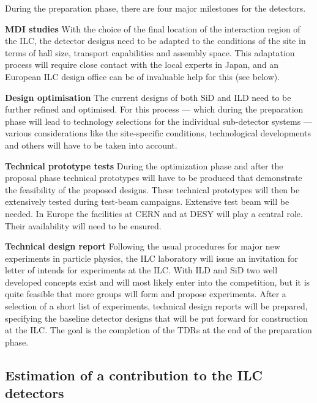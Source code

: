 \documentclass[%
 reprint,
 amsmath,amssymb,
 aps,
]{revtex4-1}
\begin{document}
During the preparation phase, there are four major milestones for the
detectors.
\begin{description}
\item{\bfseries MDI studies}
With the choice of the final location of the interaction region of the ILC, the detector designs need to be adapted to the
conditions of the site in terms of hall size, transport capabilities and
assembly space. This adaptation process
will require close contact with the local experts in Japan,
and an European ILC design office can be of invaluable help for this
(see below).
\item{\bfseries Design optimisation}
The current designs of both SiD and ILD need to be further refined and
optimised. For this process --- which during the
preparation phase will lead to technology selections for the individual
sub-detector systems --- various considerations like
the site-specific conditions, technological developments and others will
have to be taken into account. 
\item{\bfseries Technical prototype tests}
During the optimization phase and after the proposal phase technical prototypes will
have to be produced that demonstrate the feasibility of the proposed
designs.
These technical prototypes will then be extensively tested during
test-beam campaigns. Extensive test beam will be needed. In Europe the facilities at CERN and at DESY will play a central role. Their availability will need to be ensured. 

\item{\bfseries Technical design report}
Following the usual procedures for major new experiments in  particle physics, the ILC laboratory will issue an invitation for letter of intends for experiments at the ILC. With ILD and SiD two well developed concepts exist and will most likely enter into the competition, but it is quite feasible that more groups will form and propose experiments. After a selection of a short list of experiments, technical design reports will be prepared, specifying the
baseline detector designs that will be put forward for construction at
the ILC. The goal
is the completion of the TDRs at the end of the preparation phase.
\end{description}

\subsection{\label{Section:constructionmodel:ILCDet} Estimation of a
contribution to the ILC detectors}
\end{document}
